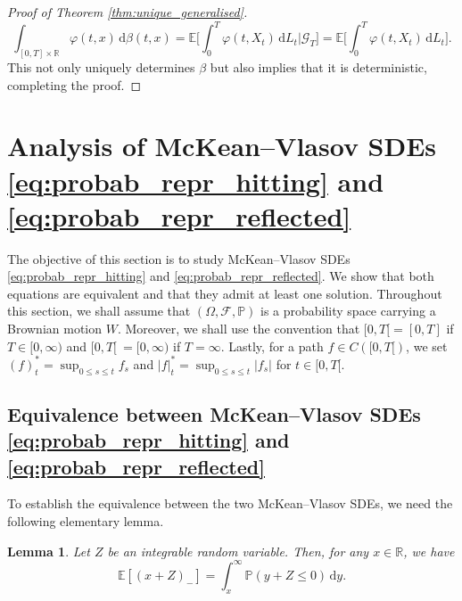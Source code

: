 \documentclass[11pt, a4paper]{article}
\theoremstyle{plain}
\newtheorem{lemma}[theorem]{Lemma}
\theoremstyle{definition}
\theoremstyle{remark}
\numberwithin{equation}{section}
\newcommand{\ev}{\mathbb{E}}
\newcommand{\pr}{\mathbb{P}}
\newcommand{\R}{\mathbb{R}}
\newcommand{\F}{\mathcal{F}}
\renewcommand{\d}{\mathrm{d}}
\renewcommand{\cal}[1]{\mathcal{#1}}
\begin{document}
\begin{proof}[Proof of Theorem \ref{thm:unique_generalised}]
\begin{equation*}
    \int_{[0, T] \times \R} \varphi(t, x) \, \d \beta(t, x) = \ev\biggl[\int_0^T \varphi(t, X_t) \, \d L_t \bigg\vert \cal{G}_T \biggr] = \ev\biggl[\int_0^T \varphi(t, X_t) \, \d L_t\biggr].
\end{equation*}
This not only uniquely determines $\beta$ but also implies that it is deterministic, completing the proof.
\end{proof}

\section{Analysis of McKean--Vlasov SDEs \texorpdfstring{\eqref{eq:probab_repr_hitting}}{(EQ)} and \texorpdfstring{\eqref{eq:probab_repr_reflected}}{(EQ)}} \label{sec:hitting_reflected}

The objective of this section is to study McKean--Vlasov SDEs \eqref{eq:probab_repr_hitting} and \eqref{eq:probab_repr_reflected}. We show that both equations are equivalent and that they admit at least one solution. Throughout this section, we shall assume that $(\Omega, \F, \pr)$ is a probability space carrying a Brownian motion $W$. Moreover, we shall use the convention that $[0, T[ = [0, T]$ if $T \in [0, \infty)$ and $[0, T[~= [0, \infty)$ if $T = \infty$. Lastly, for a path $f \in C([0, T[)$, we set $(f)^{\ast}_t = \sup_{0 \leq s \leq t} f_s$ and $\lvert f\rvert^{\ast}_t = \sup_{0 \leq s \leq t} \lvert f_s\rvert$ for $t \in [0, T[$.

\subsection{Equivalence between McKean--Vlasov SDEs \texorpdfstring{\eqref{eq:probab_repr_hitting}}{(EQ)} and \texorpdfstring{\eqref{eq:probab_repr_reflected}}{(EQ)}}

To establish the equivalence between the two McKean--Vlasov SDEs, we need the following elementary lemma.

\begin{lemma} \label{lem:relu_to_cdf}
Let $Z$ be an integrable random variable. Then, for any $x \in \R$, we have
\begin{equation} \label{eq:relu_to_cdf}
    \ev[(x + Z)_-] = \int_x^{\infty} \pr(y + Z \leq 0) \, \d y.
\end{equation}
\end{lemma}
\end{document}
